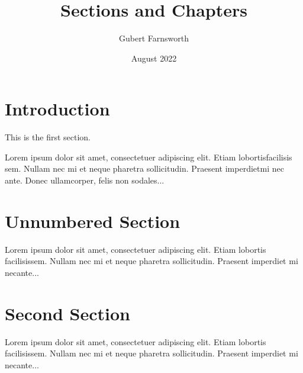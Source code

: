 \documentclass{article}
\title{Sections and Chapters}
\author{Gubert Farnsworth}
\date{August 2022}
\begin{document}
\maketitle

\tableofcontents

\section{Introduction}
   
This is the first section.
      
Lorem  ipsum  dolor  sit  amet,  consectetuer  adipiscing  
elit.   Etiam  lobortisfacilisis sem.  Nullam nec mi et 
neque pharetra sollicitudin.  Praesent imperdietmi nec ante. 
Donec ullamcorper, felis non sodales...
       
\section*{Unnumbered Section}

Lorem ipsum dolor sit amet, consectetuer adipiscing elit.  
Etiam lobortis facilisissem.  Nullam nec mi et neque pharetra 
sollicitudin.  Praesent imperdiet mi necante...

\section{Second Section}
       
Lorem ipsum dolor sit amet, consectetuer adipiscing elit.  
Etiam lobortis facilisissem.  Nullam nec mi et neque pharetra 
sollicitudin.  Praesent imperdiet mi necante...
\end{document}
